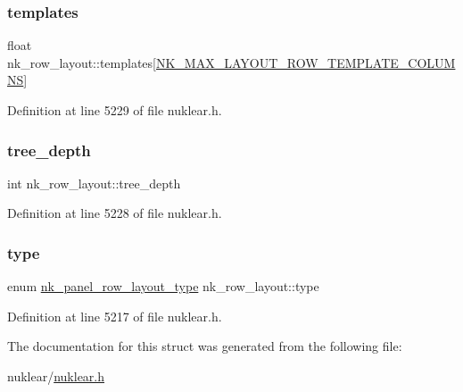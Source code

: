 \subsubsection{\texorpdfstring{templates}{templates}}
{\footnotesize\ttfamily float nk\+\_\+row\+\_\+layout\+::templates\mbox{[}\mbox{\hyperlink{nuklear_8h_a84cf276eb1ea1d22a51706df4d2c5e28}{N\+K\+\_\+\+M\+A\+X\+\_\+\+L\+A\+Y\+O\+U\+T\+\_\+\+R\+O\+W\+\_\+\+T\+E\+M\+P\+L\+A\+T\+E\+\_\+\+C\+O\+L\+U\+M\+NS}}\mbox{]}}



Definition at line 5229 of file nuklear.\+h.

\mbox{\label{structnk__row__layout_a4bc8a0292d154b34cd9b78b821a02961}} 
\subsubsection{\texorpdfstring{tree\+\_\+depth}{tree\_depth}}
{\footnotesize\ttfamily int nk\+\_\+row\+\_\+layout\+::tree\+\_\+depth}



Definition at line 5228 of file nuklear.\+h.

\mbox{\label{structnk__row__layout_a41de8f5afc0197c0bef11e4ec7d621e3}} 
\subsubsection{\texorpdfstring{type}{type}}
{\footnotesize\ttfamily enum \mbox{\hyperlink{nuklear_8h_a1bf6dfb8e793214e8bda8282721e2476}{nk\+\_\+panel\+\_\+row\+\_\+layout\+\_\+type}} nk\+\_\+row\+\_\+layout\+::type}



Definition at line 5217 of file nuklear.\+h.



The documentation for this struct was generated from the following file\+:\begin{DoxyCompactItemize}
\item 
nuklear/\mbox{\hyperlink{nuklear_8h}{nuklear.\+h}}\end{DoxyCompactItemize}
